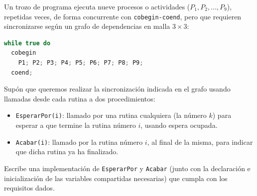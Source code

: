\begin{ejercicio}
Un trozo de programa ejecuta nueve procesos o actividades ($P_1, P_2, \dots, P_9$), repetidas veces, de forma concurrente con \texttt{cobegin-coend}, pero que requieren sincronizarse según un grafo de dependencias en malla $3 \times 3$:

\begin{center}
\end{center}

\begin{lstlisting}[language=C++]
while true do
  cobegin
    P1; P2; P3; P4; P5; P6; P7; P8; P9;
  coend;
\end{lstlisting}
Supón que queremos realizar la sincronización indicada en el grafo usando llamadas desde cada rutina a dos procedimientos:
\begin{itemize}[leftmargin=*]
    \item \texttt{EsperarPor(i)}: llamado por una rutina cualquiera (la número $k$) para esperar a que termine la rutina número $i$, usando espera ocupada.
    \item \texttt{Acabar(i)}: llamado por la rutina número $i$, al final de la misma, para indicar que dicha rutina ya ha finalizado.
\end{itemize}
Escribe una implementación de \texttt{EsperarPor} y \texttt{Acabar} (junto con la declaración e inicialización de las variables compartidas necesarias) que cumpla con los requisitos dados.
\end{ejercicio}

